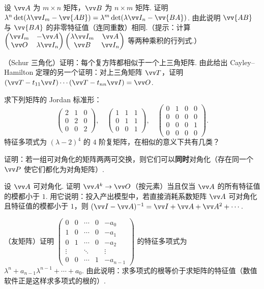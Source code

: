 {		\Cgroup
		\begin{exC}
			\item\label{ex:eig:C1} 设 $\vv A$ 为 $m\times n$ 矩阵，$\vv B$ 为 $n\times m$ 矩阵. 证明 $\lambda^n\det(\lambda\vv I_m-\vv{AB})=\lambda^m\det(\lambda\vv I_n-\vv{BA})$. 由此说明 $\vv{AB}$ 与 $\vv{BA}$ 的非零特征值（连同重数）相同.（提示：计算 $\begin{pmatrix}\vv I_m&-\vv A\\ \vv O&\lambda\vv I_n\end{pmatrix}\begin{pmatrix}\lambda\vv I_m&\vv A\\ \vv B&\vv I_n\end{pmatrix}$ 等两种乘积的行列式.）
			\item\label{ex:eig:C2} （Schur 三角化）证明：每个复方阵都相似于一个上三角矩阵. 由此给出 Cayley–Hamilton 定理的另一个证明：对上三角矩阵 $\vv T$，证明 $(\vv T-t_{11}\vv I)\cdots(\vv T-t_{nn}\vv I)=\vv O$.
			\item\label{ex:eig:C3} 求下列矩阵的 Jordan 标准形：
			\[\begin{pmatrix}2&1&0\\0&2&0\\0&0&2\end{pmatrix},\quad\begin{pmatrix}1&1&1\\0&1&1\\0&0&1\end{pmatrix},\quad\begin{pmatrix}0&1&0&0\\0&0&0&0\\0&0&0&1\\0&0&0&0\end{pmatrix}.\]
			特征多项式为 $(\lambda-2)^4$ 的 $4$ 阶复矩阵，在相似的意义下共有几类？
			\item\label{ex:eig:C4} 证明：若一组可对角化的矩阵两两可交换，则它们可以\textbf{同时}对角化（存在同一个 $\vv P$ 使它们都化为对角矩阵）.
			\item\label{ex:eig:C5} 设 $\vv A$ 可对角化. 证明 $\vv A^k\to\vv O$（按元素）当且仅当 $\vv A$ 的所有特征值的模都小于 $1$. 用它说明：投入产出模型中，若直接消耗系数矩阵 $\vv A$ 可对角化且特征值的模都小于 $1$，则 $(\vv I-\vv A)^{-1}=\vv I+\vv A+\vv A^2+\cdots$.
			\item\label{ex:eig:C6} （友矩阵）证明 $\begin{pmatrix}0&0&\cdots&0&-a_0\\1&0&\cdots&0&-a_1\\0&1&\cdots&0&-a_2\\ \vdots&&\ddots&&\vdots\\0&0&\cdots&1&-a_{n-1}\end{pmatrix}$ 的特征多项式为 $\lambda^n+a_{n-1}\lambda^{n-1}+\cdots+a_0$. 由此说明：求多项式的根等价于求矩阵的特征值（数值软件正是这样求多项式的根的）.

\end{exC}}
